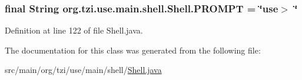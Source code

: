 \hypertarget{classorg_1_1tzi_1_1use_1_1main_1_1shell_1_1_shell_a3e9bce62b3d565cb5b799a6260e2f890}{
\subsubsection[{P\-R\-O\-M\-P\-T}]{\setlength{\rightskip}{0pt plus 5cm}final String org.\-tzi.\-use.\-main.\-shell.\-Shell.\-P\-R\-O\-M\-P\-T = \char`\"{}use$>$ \char`\"{}\hspace{0.3cm}{\ttfamily [static]}}}\label{classorg_1_1tzi_1_1use_1_1main_1_1shell_1_1_shell_a3e9bce62b3d565cb5b799a6260e2f890}


Definition at line 122 of file Shell.\-java.



The documentation for this class was generated from the following file\-:\begin{DoxyCompactItemize}
\item 
src/main/org/tzi/use/main/shell/\hyperlink{_shell_8java}{Shell.\-java}\end{DoxyCompactItemize}
